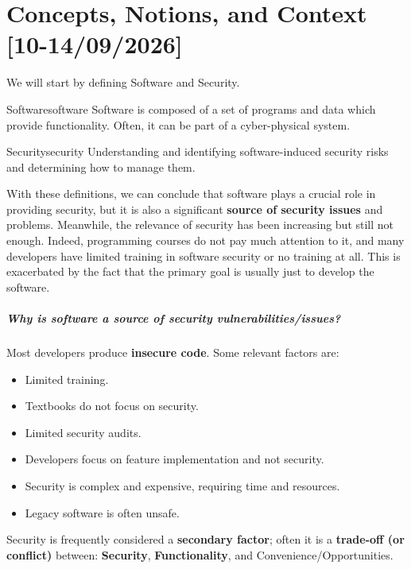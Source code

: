 \chapter{Concepts, Notions, and Context [10-14/09/2026]}
We will start by defining Software and Security.

\begin{definition}{Software}{software}
    Software is composed of a set of programs and data which provide functionality. Often, it can be part of a cyber-physical system.
\end{definition}

\begin{definition}{Security}{security}
    Understanding and identifying software-induced security risks and determining how to manage them.
\end{definition}

With these definitions, we can conclude that software plays a crucial role in providing security, but it is also a significant \textbf{source of security issues} and problems. Meanwhile, the relevance of security has been increasing but still not enough. Indeed, programming courses do not pay much attention to it, and many developers have limited training in software security or no training at all. This is exacerbated by the fact that the primary goal is usually just to develop the software.

\paragraph{Why is software a source of security vulnerabilities/issues?}
Most developers produce \textbf{insecure code}. Some relevant factors are:
\begin{itemize}
    \item Limited training.
    \item Textbooks do not focus on security.
    \item Limited security audits.
    \item Developers focus on feature implementation and not security.
    \item Security is complex and expensive, requiring time and resources.
    \item Legacy software is often unsafe.
\end{itemize}

Security is frequently considered a \textbf{secondary factor}; often it is a \textbf{trade-off (or conflict)} between: \textbf{Security}, \textbf{Functionality}, and Convenience/Opportunities.

